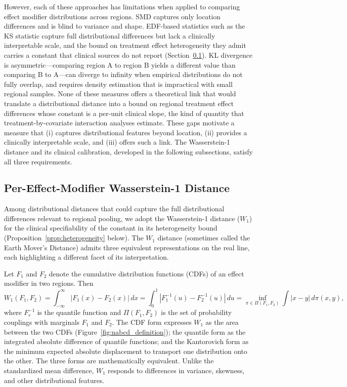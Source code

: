 However, each of these approaches has limitations when applied to comparing effect modifier distributions across regions. SMD captures only location differences and is blind to variance and shape. EDF-based statistics such as the KS statistic capture full distributional differences but lack a clinically interpretable scale, and the bound on treatment effect heterogeneity they admit carries a constant that clinical sources do not report (Section~\ref{sec:nabcd_metric}). KL divergence is asymmetric---comparing region A to region B yields a different value than comparing B to A---can diverge to infinity when empirical distributions do not fully overlap, and requires density estimation that is impractical with small regional samples. None of these measures offers a theoretical link that would translate a distributional distance into a bound on regional treatment effect differences whose constant is a per-unit clinical slope, the kind of quantity that treatment-by-covariate interaction analyses estimate. These gaps motivate a measure that (i) captures distributional features beyond location, (ii) provides a clinically interpretable scale, and (iii) offers such a link. The Wasserstein-1 distance and its clinical calibration, developed in the following subsections, satisfy all three requirements.

\subsection{Per-Effect-Modifier Wasserstein-1 Distance}\label{sec:nabcd_metric}

Among distributional distances that could capture the full distributional differences relevant to regional pooling, we adopt the Wasserstein-1 distance ($W_1$) for the clinical specifiability of the constant in its heterogeneity bound (Proposition~\ref{prop:heterogeneity} below). The $W_1$ distance (sometimes called the Earth Mover's Distance) admits three equivalent representations on the real line, each highlighting a different facet of its interpretation.\cite{villani2009,vallender1974}

Let $F_1$ and $F_2$ denote the cumulative distribution functions (CDFs) of an effect modifier in two regions. Then
\begin{equation}
W_1(F_1, F_2) = \int_{-\infty}^{\infty} |F_1(x) - F_2(x)| \, dx = \int_0^1 |F_1^{-1}(u) - F_2^{-1}(u)| \, du = \inf_{\pi \in \Pi(F_1, F_2)} \int |x - y| \, d\pi(x, y),
\label{eq:wasserstein}
\end{equation}
where $F_r^{-1}$ is the quantile function and $\Pi(F_1, F_2)$ is the set of probability couplings with marginals $F_1$ and $F_2$. The CDF form expresses $W_1$ as the area between the two CDFs (Figure~\ref{fig:nabcd_definition}); the quantile form as the integrated absolute difference of quantile functions; and the Kantorovich form as the minimum expected absolute displacement to transport one distribution onto the other. The three forms are mathematically equivalent.\cite{vallender1974} Unlike the standardized mean difference, $W_1$ responds to differences in variance, skewness, and other distributional features.\cite{panaretos2019}

